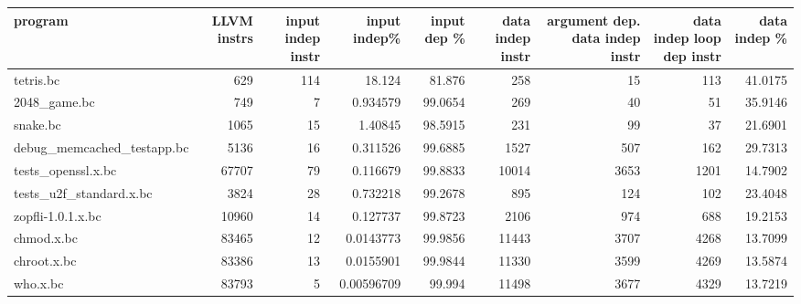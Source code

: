 \begin{tabular}{lrrrrrrrr}
\hline
 program                    &   LLVM instrs &   input indep instr &   input indep\% &   input dep \% &   data indep instr &   argument dep. data indep instr &   data indep loop dep instr &   data indep \% \\
\hline
 tetris.bc                  &           629 &                 114 &    18.124      &       81.876  &                258 &                               15 &                         113 &        41.0175 \\
 2048\_game.bc               &           749 &                   7 &     0.934579   &       99.0654 &                269 &                               40 &                          51 &        35.9146 \\
 snake.bc                   &          1065 &                  15 &     1.40845    &       98.5915 &                231 &                               99 &                          37 &        21.6901 \\
 debug\_memcached\_testapp.bc &          5136 &                  16 &     0.311526   &       99.6885 &               1527 &                              507 &                         162 &        29.7313 \\
 tests\_openssl.x.bc         &         67707 &                  79 &     0.116679   &       99.8833 &              10014 &                             3653 &                        1201 &        14.7902 \\
 tests\_u2f\_standard.x.bc    &          3824 &                  28 &     0.732218   &       99.2678 &                895 &                              124 &                         102 &        23.4048 \\
 zopfli-1.0.1.x.bc          &         10960 &                  14 &     0.127737   &       99.8723 &               2106 &                              974 &                         688 &        19.2153 \\
 chmod.x.bc                 &         83465 &                  12 &     0.0143773  &       99.9856 &              11443 &                             3707 &                        4268 &        13.7099 \\
 chroot.x.bc                &         83386 &                  13 &     0.0155901  &       99.9844 &              11330 &                             3599 &                        4269 &        13.5874 \\
 who.x.bc                   &         83793 &                   5 &     0.00596709 &       99.994  &              11498 &                             3677 &                        4329 &        13.7219 \\
\hline
\end{tabular}